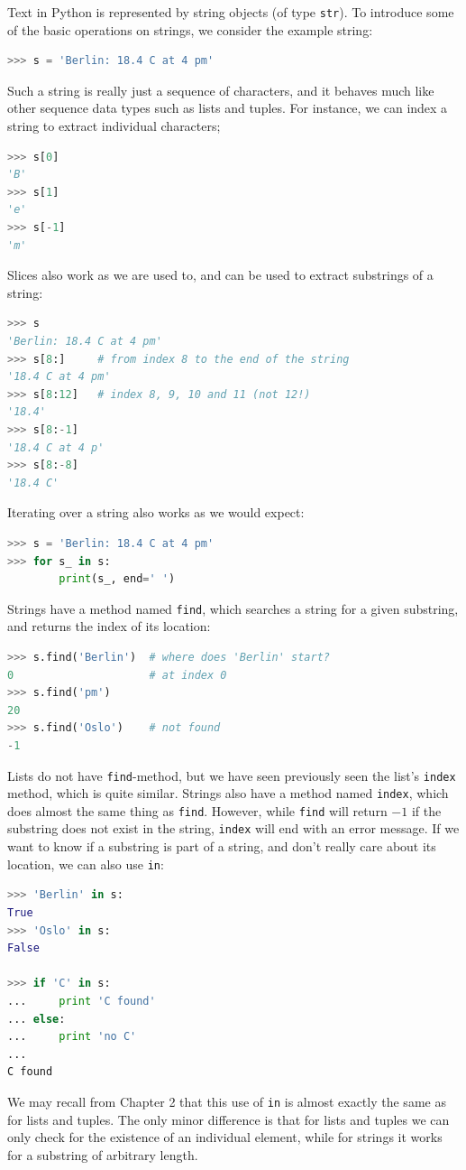 \documentclass[graybox,envcountchap,sectrefs,final]{svmonodo}
\begin{document}
Text in Python is represented by string objects (of type \texttt{str}). To introduce some
of the basic operations on strings, we consider the example string:
\begin{lstlisting}[language=Python,style=blue1]
>>> s = 'Berlin: 18.4 C at 4 pm'
\end{lstlisting}
Such a string is really just a sequence of characters, and it behaves much like
other sequence data types such as lists and tuples. For instance,
we can index a string to extract individual characters;
\begin{lstlisting}[language=Python,style=blue1]
>>> s[0]
'B'
>>> s[1]
'e'
>>> s[-1]
'm'
\end{lstlisting}
Slices also work as we are used to, and can be used to extract substrings of a string:
\begin{lstlisting}[language=Python,style=blue1]
>>> s
'Berlin: 18.4 C at 4 pm'
>>> s[8:]     # from index 8 to the end of the string
'18.4 C at 4 pm'
>>> s[8:12]   # index 8, 9, 10 and 11 (not 12!)
'18.4'
>>> s[8:-1]
'18.4 C at 4 p'
>>> s[8:-8]
'18.4 C'
\end{lstlisting}
Iterating over a string also works as we would expect:
\begin{lstlisting}[language=Python,style=blue1]
>>> s = 'Berlin: 18.4 C at 4 pm'
>>> for s_ in s:
    	print(s_, end=' ')
\end{lstlisting}

Strings have a method named \texttt{find}, which searches a string for a given substring, and returns
the index of its location:
\begin{lstlisting}[language=Python,style=blue1]
>>> s.find('Berlin')  # where does 'Berlin' start?
0                     # at index 0
>>> s.find('pm')
20
>>> s.find('Oslo')    # not found
-1
\end{lstlisting}
Lists do not have \texttt{find}-method, but we have seen previously seen the list's \texttt{index} method,
which is quite similar. Strings also have a method named \texttt{index}, which does almost the same thing
as \texttt{find}. However, while \texttt{find} will return $-1$ if the substring does not exist in the string, \texttt{index}
will end with an error message. If we want to know if a substring is part of a string, and don't really
care about its location, we can also use \texttt{in}:
\begin{lstlisting}[language=Python,style=blue1]
>>> 'Berlin' in s:
True
>>> 'Oslo' in s:
False

>>> if 'C' in s:
...     print 'C found'
... else:
...     print 'no C'
...
C found
\end{lstlisting}
We may recall from Chapter 2 that this use of \texttt{in} is almost exactly the same as for lists and tuples. The
only minor difference is that for lists and tuples we can only check for the existence of an individual
element, while for strings it works for a substring of arbitrary length.
\end{document}
